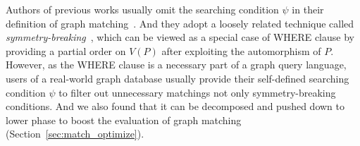 Authors of previous works usually omit the searching condition $\psi$ in their definition of graph matching~\cite{DBLP:conf/sigmod/ShaoCCMYX14,DBLP:journals/pvldb/LaiQLC15,DBLP:conf/sigmod/KimLBHLKJ16,DBLP:journals/pvldb/QiaoZC17}.
And they adopt a loosely related technique called \emph{symmetry-breaking}~\cite{DBLP:conf/recomb/GrochowK07},
which can be viewed as a special case of WHERE clause by providing a partial order on $V(P)$ after exploiting the automorphism of $P$.
However, as the WHERE clause is a necessary part of a graph query language,
users of a real-world graph database usually provide their self-defined searching condition $\psi$ to filter out unnecessary matchings not only symmetry-breaking conditions.
And we also found that it can be decomposed and pushed down to lower phase to boost the evaluation of graph matching (Section~\ref{sec:match_optimize}).
